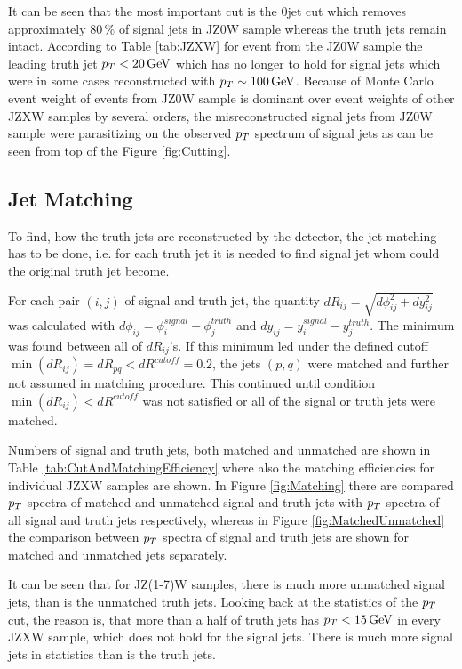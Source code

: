 It can be seen that the most important cut is the 0jet cut which removes
approximately $80\,\%$ of signal jets in JZ0W sample whereas the truth jets
remain intact. According to Table \ref{tab:JZXW} for event from the JZ0W sample
the leading truth jet $p_{T} < 20 \,\text{GeV}$ which has no longer to hold for signal
jets which were in some cases reconstructed with $p_{T} \sim 100 \,\text{GeV}$. Because of
Monte Carlo event weight of events from JZ0W sample is dominant over event
weights of other JZXW samples by several orders, the misreconstructed signal
jets from JZ0W sample were parasitizing on the observed $p_{T}$ spectrum of signal
jets as can be seen from top of the Figure \ref{fig:Cutting}.

\subsection{Jet Matching}
\label{SubSec:JetMatching}

To find, how the truth jets are reconstructed by the detector, the jet matching
has to be done, i.e. for each truth jet it is needed to find signal jet whom
could the original truth jet become. 

For each pair $(i,j)$ of signal and truth jet, the quantity $dR_{ij} =
\sqrt{d\phi_{ij}^2 + dy_{ij}^2}$ was calculated with $d\phi_{ij} =
\phi_i^{signal} - \phi_j^{truth}$ and $dy_{ij} = y_i^{signal} - y_j^{truth}$.
The minimum was found between all of $dR_{ij}$'s. If this minimum led under the
defined cutoff $\min(dR_{ij}) = dR_{pq} < dR^{cutoff} = 0.2$, the jets $(p,q)$
were matched and further not assumed in matching procedure. This continued until
condition $\min(dR_{ij}) < dR^{cutoff}$ was not satisfied or all of the signal
or truth jets were matched.

Numbers of signal and truth jets, both matched and unmatched are shown in Table
\ref{tab:CutAndMatchingEfficiency} where also the matching efficiencies for
individual JZXW samples are shown. In Figure \ref{fig:Matching} there are
compared $p_{T}$ spectra of matched and unmatched signal and truth jets with $p_{T}$
spectra of all signal and truth jets respectively, whereas in Figure
\ref{fig:MatchedUnmatched} the comparison between $p_{T}$ spectra of signal and
truth jets are shown for matched and unmatched jets separately.

It can be seen that for JZ(1-7)W samples, there is much more unmatched signal
jets, than is the unmatched truth jets. Looking back at the statistics of the
$p_{T}$ cut, the reason is, that more than a half of truth jets has $p_{T} < 15
\,\text{GeV}$ in every JZXW sample, which does not hold for the signal jets. There is
much more signal jets in statistics than is the truth jets. 


